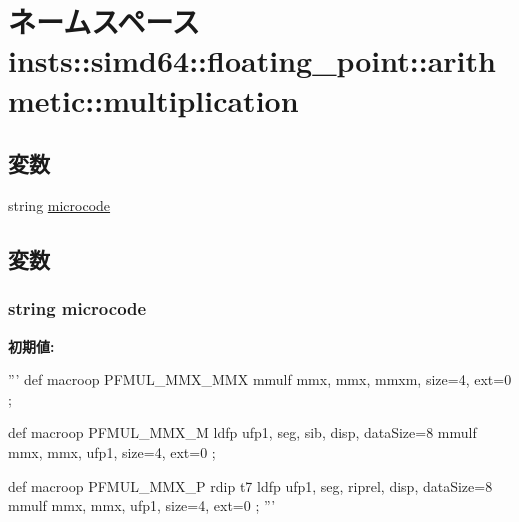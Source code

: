 \hypertarget{namespaceinsts_1_1simd64_1_1floating__point_1_1arithmetic_1_1multiplication}{
\section{ネームスペース insts::simd64::floating\_\-point::arithmetic::multiplication}
\label{namespaceinsts_1_1simd64_1_1floating__point_1_1arithmetic_1_1multiplication}
}
\subsection*{変数}
\begin{DoxyCompactItemize}
\item 
string \hyperlink{namespaceinsts_1_1simd64_1_1floating__point_1_1arithmetic_1_1multiplication_a770f11a173e99389a8802f0107ed8f52}{microcode}
\end{DoxyCompactItemize}


\subsection{変数}
\hypertarget{namespaceinsts_1_1simd64_1_1floating__point_1_1arithmetic_1_1multiplication_a770f11a173e99389a8802f0107ed8f52}{
\subsubsection[{microcode}]{\setlength{\rightskip}{0pt plus 5cm}string {\bf microcode}}}
\label{namespaceinsts_1_1simd64_1_1floating__point_1_1arithmetic_1_1multiplication_a770f11a173e99389a8802f0107ed8f52}
{\bfseries 初期値:}
\begin{DoxyCode}
'''
def macroop PFMUL_MMX_MMX {
    mmulf mmx, mmx, mmxm, size=4, ext=0
};

def macroop PFMUL_MMX_M {
    ldfp ufp1, seg, sib, disp, dataSize=8
    mmulf mmx, mmx, ufp1, size=4, ext=0
};

def macroop PFMUL_MMX_P {
    rdip t7
    ldfp ufp1, seg, riprel, disp, dataSize=8
    mmulf mmx, mmx, ufp1, size=4, ext=0
};
'''
\end{DoxyCode}
